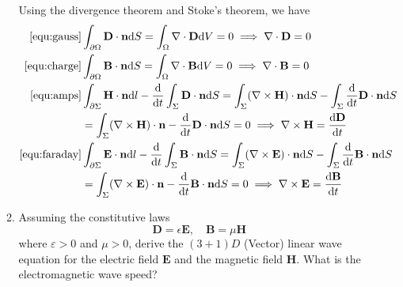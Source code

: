 \documentclass[a4paper,12pt]{article}
\newcommand{\dd}[1]{\mathrm{d}#1}
\begin{document}
\begin{enumerate}[label = \arabic*.]
\begin{enumerate}[label = (\alph*)]
		Using the divergence theorem and Stoke's theorem, we have
		\begin{align*}
			\eqref{equ:gauss} & \int_{\partial \Omega} \textbf{D}\cdot \textbf{n} \dd S = \int_\Omega \nabla \cdot \textbf{D} \dd V = 0 \implies \nabla \cdot \textbf{D} = 0 \\
			\eqref{equ:charge} & \int_{\partial\Omega} \textbf{B} \cdot \textbf{n} \dd S = \int_\Omega \nabla \cdot \textbf{B} \dd V = 0 \implies \nabla \cdot \textbf{B} = 0 \\
			\eqref{equ:amps} & \int_{\partial \Sigma} \textbf{H} \cdot \textbf{n} \dd l - \frac{\dd}{\dd t} \int_\Sigma \textbf{D} \cdot \textbf{n} \dd S = \int_\Sigma (\nabla \times \textbf{H}) \cdot \textbf{n} \dd S - \int_\Sigma \frac{\dd}{\dd t} \textbf{D} \cdot \textbf{n} \dd S \\
			&= \int_\Sigma (\nabla \times \textbf{H}) \cdot \textbf{n} - \frac{\dd}{\dd t} \textbf{D} \cdot \textbf{n} \dd S = 0 \implies \nabla \times \textbf{H} = \frac{\dd \textbf{D}}{\dd t}\\
			\eqref{equ:faraday} & \int_{\partial \Sigma} \textbf{E} \cdot \textbf{n} \dd l - \frac{\dd}{\dd t} \int_\Sigma \textbf{B} \cdot \textbf{n} \dd S = \int_\Sigma (\nabla \times \textbf{E}) \cdot \textbf{n} \dd S - \int_\Sigma \frac{\dd}{\dd t} \textbf{B} \cdot \textbf{n} \dd S \\
			&= \int_\Sigma (\nabla \times \textbf{E}) \cdot \textbf{n} - \frac{\dd}{\dd t} \textbf{B} \cdot \textbf{n} \dd S = 0 \implies \nabla \times \textbf{E} = \frac{\dd \textbf{B}}{\dd t}\\
		\end{align*}
		
		\item Assuming the constitutive laws
		\[
			\textbf{D} = \epsilon \textbf{E}, \quad \textbf{B} = \mu \textbf{H}
		\]
		where $ \varepsilon > 0 $ and $ \mu > 0 $, derive the $ (3 + 1)D $ (Vector) linear wave equation for the electric field $ \textbf{E} $ and the magnetic field \textbf{H}. What is the electromagnetic wave speed?
		

\end{enumerate}
\end{enumerate}
\end{document}
